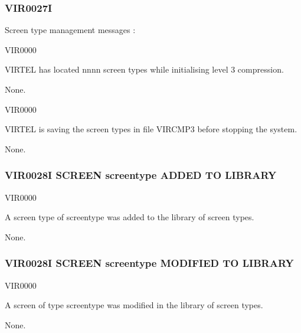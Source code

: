 \documentclass[letterpaper,10pt,english]{sphinxmanual}
\begin{document}
\subsubsection{VIR0027I}
\label{\detokenize{messages:vir0027i}}
\sphinxAtStartPar
Screen type management messages :
\begin{description}
\begin{description}
\sphinxAtStartPar
VIR0000

\sphinxAtStartPar
VIRTEL has located nnnn screen types while initialising level 3 compression.

\sphinxAtStartPar
None.

\end{description}

\begin{description}
\sphinxAtStartPar
VIR0000

\sphinxAtStartPar
VIRTEL is saving the screen types in file VIRCMP3 before stopping the system.

\sphinxAtStartPar
None.

\end{description}

\end{description}


\subsubsection{VIR0028I SCREEN screentype ADDED TO LIBRARY}
\label{\detokenize{messages:vir0028i-screen-screentype-added-to-library}}\begin{description}
\sphinxAtStartPar
VIR0000

\sphinxAtStartPar
A screen type of screentype was added to the library of screen types.

\sphinxAtStartPar
None.

\end{description}


\subsubsection{VIR0028I SCREEN screentype MODIFIED TO LIBRARY}
\label{\detokenize{messages:vir0028i-screen-screentype-modified-to-library}}\begin{description}
\sphinxAtStartPar
VIR0000

\sphinxAtStartPar
A screen of type screentype was modified in the library of screen types.

\sphinxAtStartPar
None.

\end{description}
\end{document}
